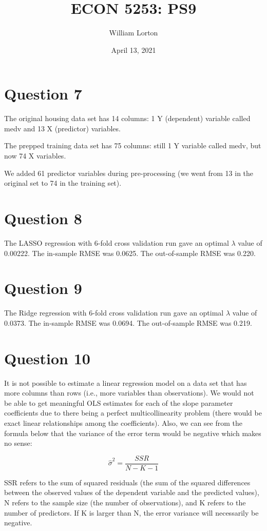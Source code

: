 \documentclass{article}
\title{ECON 5253: PS9}
\author{William Lorton}
\date{April 13, 2021}
\begin{document}
\maketitle

\section{Question 7}

The original housing data set has 14 columns: 1 Y (dependent) variable called medv and 13 X (predictor) variables.

The prepped training data set has 75 columns: still 1 Y variable called medv, but now 74 X variables. 

We added 61 predictor variables during pre-processing (we went from 13 in the original set to 74 in the training set).

\section{Question 8}

The LASSO regression with 6-fold cross validation run gave an optimal $\lambda$ value of 0.00222. The in-sample RMSE was 0.0625. The out-of-sample RMSE was 0.220.

\section{Question 9}

The Ridge regression with 6-fold cross validation run gave an optimal $\lambda$ value of 0.0373. The in-sample RMSE was 0.0694. The out-of-sample RMSE was 0.219.

\section{Question 10}

It is not possible to estimate a linear regression model on a data set that has more columns than rows (i.e., more variables than observations). We would not be able to get meaningful OLS estimates for each of the slope parameter coefficients due to there being a perfect multicollinearity problem (there would be exact linear relationships among the coefficients). Also, we can see from the formula below that the variance of the error term would be negative which makes no sense:

\[ \hat{\sigma}^2 = \frac{SSR}{N-K-1}\]

SSR refers to the sum of squared residuals (the sum of the squared differences between the observed values of the dependent variable and the predicted values), N refers to the sample size (the number of observations), and K refers to the number of predictors. If K is larger than N, the error variance will necessarily be negative.
\end{document}
